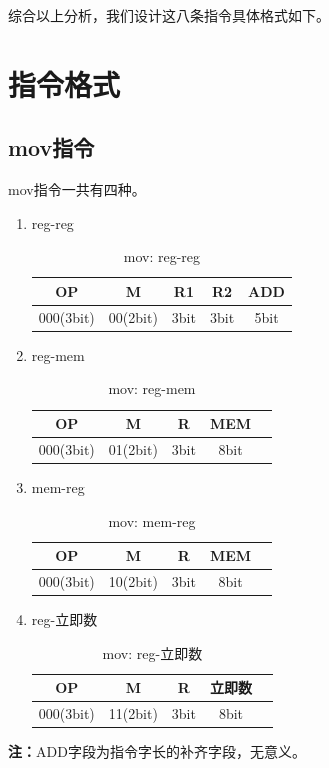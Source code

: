 \documentclass[UTF8]{ctexrep}
\begin{document}
综合以上分析，我们设计这八条指令具体格式如下。

\section{指令格式}

\subsection{mov指令}

mov指令一共有四种。
\begin{enumerate}
\item reg-reg
\begin{table}[H]
\centering
\begin{tabular}{|c|c|c|c|c|}
\hline
OP        & M        & R1   & R2   & ADD  \\ \hline
000(3bit) & 00(2bit) & 3bit & 3bit & 5bit \\ \hline
\end{tabular}
\caption{mov: reg-reg}
\label{tab:3}
\end{table}

\item reg-mem
\begin{table}[H]
\centering
\begin{tabular}{|c|c|c|c|c|}
\hline
OP        & M        & R    & MEM  \\ \hline
000(3bit) & 01(2bit) & 3bit & 8bit \\ \hline
\end{tabular}
\caption{mov: reg-mem}
\label{tab:4}
\end{table}

\item mem-reg
\begin{table}[H]
\centering
\begin{tabular}{|c|c|c|c|c|}
\hline
OP        & M        & R   & MEM  \\ \hline
000(3bit) & 10(2bit) & 3bit & 8bit \\ \hline
\end{tabular}
\caption{mov: mem-reg}
\label{tab:5}
\end{table}
\item reg-立即数
\begin{table}[H]
\centering
\begin{tabular}{|c|c|c|c|c|}
\hline
OP        & M        & R    & 立即数  \\ \hline
000(3bit) & 11(2bit) & 3bit & 8bit \\ \hline
\end{tabular}
\caption{mov: reg-立即数}
\label{tab:6}
\end{table}

\end{enumerate}
\textbf{注：}ADD字段为指令字长的补齐字段，无意义。
\end{document}
